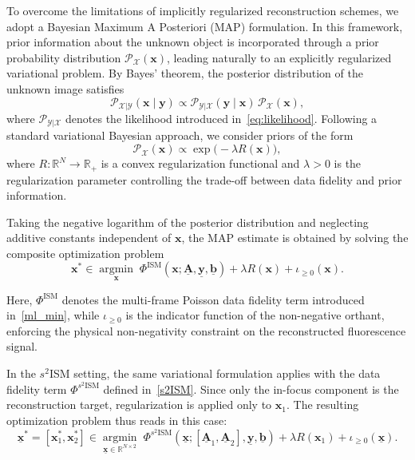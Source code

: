 \documentclass[letterpaper]{article}
\newcommand{\x}{\mathbf{x}}
\newcommand{\A}{\mathbf{A}}
\newcommand{\y}{\mathbf{y}}
\begin{document}
To overcome the limitations of implicitly regularized reconstruction schemes, we adopt a Bayesian Maximum A Posteriori (MAP) formulation. In this framework, prior information about the unknown object is incorporated through a prior probability distribution $\mathcal{P}_{\mathcal{X}}(\x)$, leading naturally to an explicitly regularized variational problem. By Bayes' theorem, the posterior distribution of the unknown image satisfies
\[
\mathcal{P}_{\mathcal{X}|\mathcal{Y}}(\x \mid \mathbf{y})
\propto
\mathcal{P}_{\mathcal{Y}|\mathcal{X}}(\mathbf{y}\mid\x)
\,
\mathcal{P}_{\mathcal{X}}(\x),
\]
where $\mathcal{P}_{\mathcal{Y}|\mathcal{X}}$ denotes the likelihood introduced in~\eqref{eq:likelihood}. Following a standard variational Bayesian approach, we consider priors of the form
\begin{equation}
\label{MAP_eq}
\mathcal{P}_{\mathcal{X}}(\x)
\propto
\exp\bigl(-\lambda R(\x)\bigr),
\end{equation}
where
$
R:\mathbb{R}^N \to \mathbb{R}_{+}
$
is a convex regularization functional and $\lambda>0$ is the regularization parameter controlling the trade-off between data fidelity and prior information.

Taking the negative logarithm of the posterior distribution and neglecting additive constants independent of $\x$, the MAP estimate is obtained by solving the composite optimization problem
\begin{equation}
\label{Map_min}
\x^*
\in
\operatorname*{argmin}_{\x}
\;
\Phi^{\text{ISM}}
(\x;\underline{\A},\underline{\y},\underline{\mathbf{b}})
+
\lambda R(\x)
+
\iota_{\geq0}(\x).
\end{equation}

Here,
$\Phi^{\text{ISM}}$
denotes the multi-frame Poisson data fidelity term introduced in~\eqref{ml_min}, while
$\iota_{\geq0}$
is the indicator function of the non-negative orthant, enforcing the physical non-negativity constraint on the reconstructed fluorescence signal.

In the $s^2$ISM setting, the same variational formulation applies with the data fidelity term $\Phi^{s^2\text{ISM}}$ defined in~\eqref{s2ISM}. Since only the in-focus component is the reconstruction target, regularization is applied only to $\x_1$. The resulting optimization problem thus reads in this case:
\begin{equation} \label{eq:prob_s2ISM}
\underline{\x}^*
=
[\x_1^*,\x_2^*]
\in
\operatorname*{argmin}_{\underline{\x}\in\mathbb{R}^{N\times2}}
\;
\Phi^{s^2\text{ISM}}
(
\underline{\x};
[\underline{\mathbf{A}}_1,\underline{\mathbf{A}}_2],
\underline{\mathbf{y}},
\underline{\mathbf{b}}
)
+
\lambda R(\x_1)
+
\iota_{\geq0}(\underline{\x}).
\end{equation}
\end{document}
